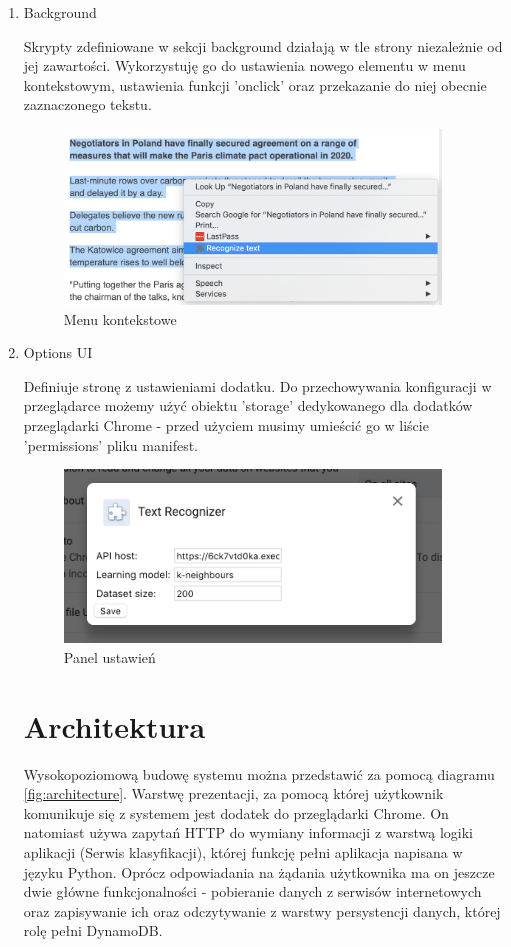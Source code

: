 \begin{enumerate}
    \item Background
    
    Skrypty zdefiniowane w sekcji background działają w tle strony niezależnie od jej zawartości. Wykorzystuję go do ustawienia nowego elementu w menu kontekstowym, ustawienia funkcji 'onclick' oraz przekazanie do niej obecnie zaznaczonego tekstu.
    
    \begin{figure}[H]
    \centering
    \includegraphics[width=10cm]{images/implementacja/context_menu.png}
    \caption{Menu kontekstowe}
    \end{figure}
    
    \item Options UI
    
    Definiuje stronę z ustawieniami dodatku. Do przechowywania konfiguracji w przeglądarce możemy użyć obiektu 'storage' dedykowanego dla dodatków przeglądarki Chrome - przed użyciem musimy umieścić go w liście 'permissions' pliku manifest. 
    
    \begin{figure}[H]
    \centering
    \includegraphics[width=10cm]{images/implementacja/options.png}
    \caption{Panel ustawień}
    \end{figure}
    
\newpage
\section{Architektura}

Wysokopoziomową budowę systemu można przedstawić za pomocą diagramu \ref{fig:architecture}. Warstwę prezentacji, za pomocą której użytkownik komunikuje się z systemem jest dodatek do przeglądarki Chrome. On natomiast używa zapytań HTTP do wymiany informacji z warstwą logiki aplikacji (Serwis klasyfikacji), której funkcję pełni aplikacja napisana w języku Python. Oprócz odpowiadania na żądania użytkownika ma on jeszcze dwie główne funkcjonalności - pobieranie danych z serwisów internetowych oraz zapisywanie ich oraz odczytywanie z warstwy persystencji danych, której rolę pełni DynamoDB.


\end{enumerate}

